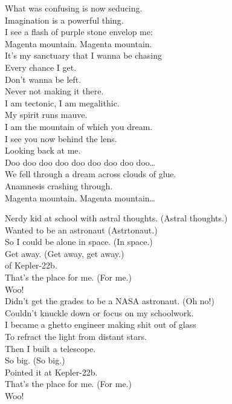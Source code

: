 What was confusing is now seducing. \\
Imagination is a powerful thing. \\
I see a flash of purple stone envelop me: \\

Magenta mountain. Magenta mountain. \\
It's my sanctuary that I wanna be chasing \\
Every chance I get. \\
Don't wanna be left. \\
Never not making it there. \\

I am tectonic, I am megalithic. \\
My spirit runs mauve. \\
I am the mountain of which you dream. \\
I see you now behind the lens. \\
Looking back at me. \\

Doo doo doo doo doo doo doo doo doo… \\

We fell through a dream across clouds of glue. \\
Anamnesis crashing through. \\

Magenta mountain. Magenta mountain… \\





Nerdy kid at school with astral thoughts. (Astral thoughts.) \\
Wanted to be an astronaut (Astrtonaut.) \\
So I could be alone in space. (In space.) \\
Get away. (Get away, get away.) \\
 of Kepler-22b. \\
That's the place for me. (For me.) \\
Woo! \\

Didn't get the grades to be a NASA astronaut. (Oh no!) \\
Couldn't knuckle down or focus on my schoolwork. \\
I became a ghetto engineer making shit out of glass \\
To refract the light from distant stars. \\
Then I built a telescope. \\
So big. (So big.) \\
Pointed it at Kepler-22b. \\
That's the place for me. (For me.) \\
Woo! \\

